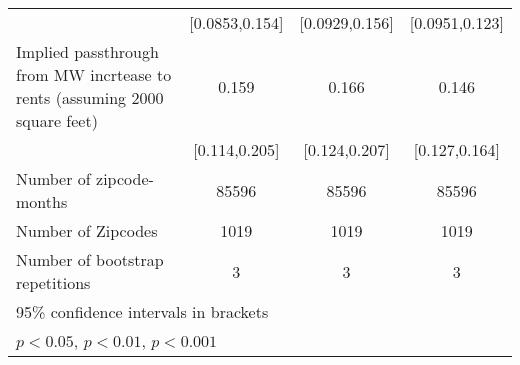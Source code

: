 {\begin{tabular}{l*{3}{c}}
            &        [0.0853,0.154]         &        [0.0929,0.156]         &        [0.0951,0.123]         \\
[1em]
Implied passthrough from MW incrtease to rents (assuming 2000 square feet)&                 0.159\sym{***}&                 0.166\sym{***}&                 0.146\sym{***}\\
            &         [0.114,0.205]         &         [0.124,0.207]         &         [0.127,0.164]         \\
\hline
Number of zipcode-months&                 85596         &                 85596         &                 85596         \\
Number of Zipcodes&                  1019         &                  1019         &                  1019         \\
Number of bootstrap repetitions&                     3         &                     3         &                     3         \\
\hline\hline
\multicolumn{4}{l}{\footnotesize 95\% confidence intervals in brackets}\\
\multicolumn{4}{l}{\footnotesize \sym{*} \(p<0.05\), \sym{**} \(p<0.01\), \sym{***} \(p<0.001\)}\\
\end{tabular}
}
